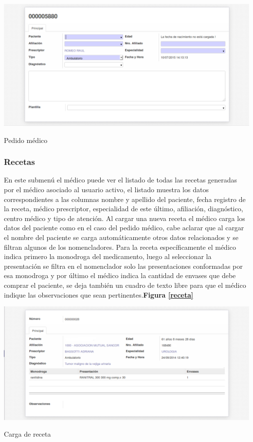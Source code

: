 \begin{correccionFigure}[h]
      \centering
      \includegraphics[width=.8\textwidth]{img/tp1/HE/PedidoMedico}
      \caption{Pedido médico}
      \label{pedido-medico}
\end{correccionFigure}

{\correccionTexto
\subsubsection{Recetas}
En este submenú el médico puede ver el listado de todas las recetas generadas por el médico asociado al usuario activo, el listado muestra los datos correspondientes a las columnas nombre y apellido del paciente, fecha registro de la receta, médico prescriptor, especialidad de este último, afiliación, diagnóstico, centro médico y tipo de atención. Al cargar una nueva receta el médico carga los datos del paciente como en el caso del pedido médico, cabe aclarar que al cargar el nombre del paciente se carga automáticamente otros datos relacionados y se filtran algunos de los nomencladores. Para la receta específicamente el médico indica primero la monodroga del medicamento, luego al seleccionar la presentación se filtra en el nomenclador solo las presentaciones conformadas por esa monodroga y por último el médico indica la cantidad de envases que debe comprar el paciente, se deja también un cuadro de texto libre para que el médico indique las observaciones que sean pertinentes.\textbf{Figura \ref{receta}}}

\begin{correccionFigure}
      \centering
      \includegraphics[width=.8\textwidth]{img/tp1/HE/Receta}
      \caption{Carga de receta}
      \label{receta}
\end{correccionFigure}

